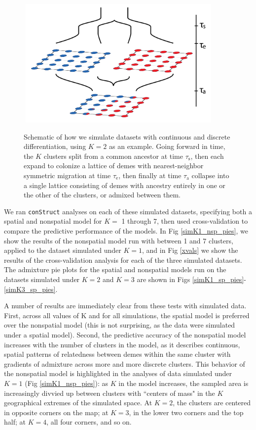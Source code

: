 \documentclass[12pt]{article}
\begin{document}
\begin{figure}
	\centering
		{\includegraphics[width=4in,height=2.5in]{figs/sims/sim_setup.png}}
		\caption{Schematic of how we simulate datasets with continuous and discrete differentiation, using $K=2$ as an example.  
			    Going forward in time, the $K$ clusters split from a common ancestor at time $\tau_{\text{s}}$,
			    then each expand to colonize a lattice of demes with nearest-neighbor symmetric migration at time $\tau_{\text{e}}$,
			    then finally at time $\tau_{\text{a}}$ collapse into a single lattice consisting of demes 
			    with ancestry entirely in one or the other of the clusters,
			    or admixed between them.
			    }\label{sim_setup}
\end{figure}

We ran \texttt{conStruct} analyses on each of these simulated datasets, 
specifying both a spatial and nonspatial model for $K = $ 1 through 7, 
then used cross-validation to compare the predictive performance of the models.
In Fig \ref{simK1_nsp_pies}, we show the results of the nonspatial model 
run with between 1 and 7 clusters, applied to the dataset simulated under $K=1$,
and in Fig \ref{xvals} we show the results of the cross-validation analysis for each of the three simulated datasets.
The admixture pie plots for the spatial and nonspatial models run on the datasets simulated under $K=2$ and $K=3$
are shown in Figs \ref{simK1_sp_pies}-\ref{simK3_sp_pies}.

A number of results are immediately clear from these tests with simulated data.
First, across all values of K and for all simulations, 
the spatial model is preferred over the nonspatial model
(this is not surprising, as the data were simulated under a spatial model).
Second, the predictive accuracy of the nonspatial model increases with the number of clusters in the model, 
as it describes continuous, spatial patterns of relatedness between demes within the same cluster 
with gradients of admixture across more and more discrete clusters.
This behavior of the nonspatial model is highlighted in the analyses of data simulated under $K=1$ (Fig \ref{simK1_nsp_pies}):
as $K$ in the model increases, 
the sampled area is increasingly divvied up between clusters 
with ``centers of mass" in the $K$ geographical extremes of the simulated space.
At $K=2$, the clusters are centered in opposite corners on the map; 
at $K=3$, in the lower two corners and the top half; 
at $K=4$, all four corners, and so on.
\end{document}
